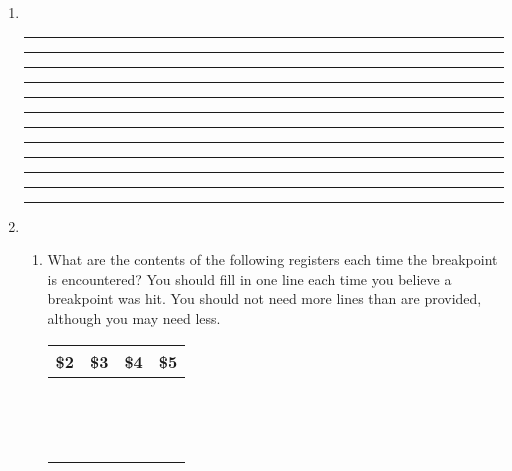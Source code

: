 \documentclass[a4paper,10pt]{article}
\begin{document}
\begin{enumerate}
\item~

\vspace{7mm}\hrule\vspace{7mm}\hrule\vspace{7mm}\hrule\vspace{7mm}\hrule\vspace{7mm}\hrule
\vspace{7mm}\hrule\vspace{7mm}\hrule\vspace{7mm}\hrule\vspace{7mm}\hrule
\vspace{7mm}\hrule\vspace{7mm}\hrule\vspace{7mm}\hrule\vspace{3mm}

\newpage
\item

\begin{enumerate}
 \item What are the contents of the following registers each time the
breakpoint is encountered? You should fill in one line each time you
believe a breakpoint was hit. You should not need more lines than are
provided, although you may need less.

\begin{center}
\begin{tabular}{|c|c|c|c|}
\hline\hspace{8mm}\textbf{\$2}\hspace{8mm} & \hspace{8mm}\textbf{\$3}\hspace{8mm} & \hspace{8mm}\textbf{\$4}\hspace{8mm} & \hspace{8mm}\textbf{\$5}\hspace{8mm} \\
\hline & & & \\ & & & \\
\hline & & & \\ & & & \\
\hline & & & \\ & & & \\
\hline & & & \\ & & & \\
\hline & & & \\ & & & \\
\hline & & & \\ & & & \\
\hline & & & \\ & & & \\
\hline


\end{tabular}
\end{center}
\end{enumerate}
\end{enumerate}
\end{document}
